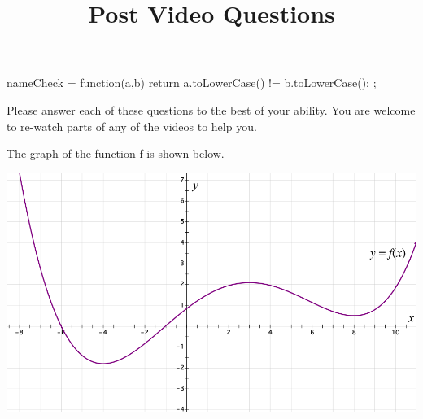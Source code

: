 \documentclass[handout]{ximera}
\title{Post Video Questions}
\begin{document}
\begin{abstract}
\end{abstract}


\maketitle

\begin{javascript}
  nameCheck = function(a,b) {
    return a.toLowerCase() != b.toLowerCase();
  };
\end{javascript}

Please answer each of these questions to the best of your ability. You are welcome to re-watch parts of any of the videos to help you.

The graph of the function f is shown below.

\begin{image}
\includegraphics{Picture2.png}
\end{image}
\end{document}

